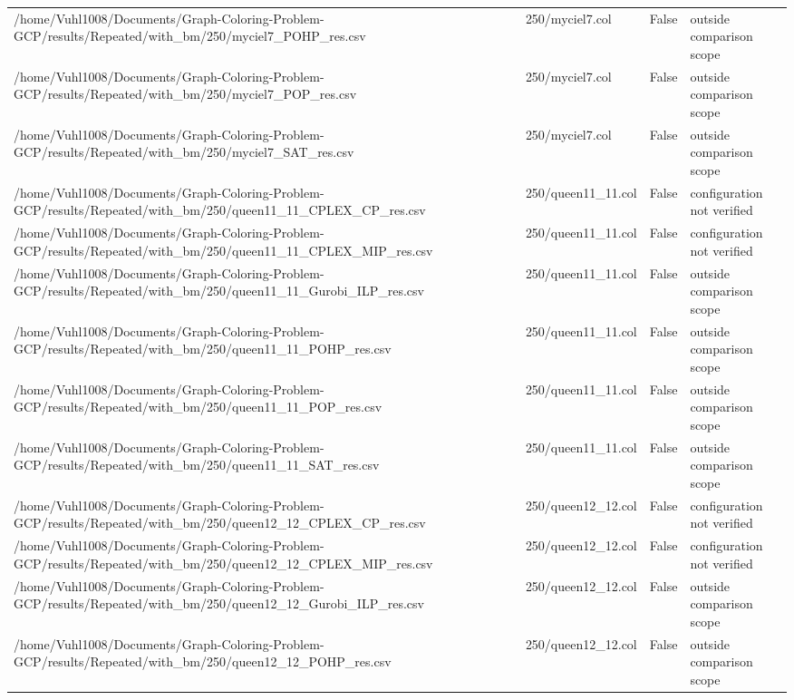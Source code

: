 \begin{table}[htbp]
\begin{tabular}{llll}
/home/Vuhl1008/Documents/Graph-Coloring-Problem-GCP/results/Repeated/with\_bm/250/myciel7\_POHP\_res.csv & 250/myciel7.col & False & outside comparison scope \\
/home/Vuhl1008/Documents/Graph-Coloring-Problem-GCP/results/Repeated/with\_bm/250/myciel7\_POP\_res.csv & 250/myciel7.col & False & outside comparison scope \\
/home/Vuhl1008/Documents/Graph-Coloring-Problem-GCP/results/Repeated/with\_bm/250/myciel7\_SAT\_res.csv & 250/myciel7.col & False & outside comparison scope \\
/home/Vuhl1008/Documents/Graph-Coloring-Problem-GCP/results/Repeated/with\_bm/250/queen11\_11\_CPLEX\_CP\_res.csv & 250/queen11\_11.col & False & configuration not verified \\
/home/Vuhl1008/Documents/Graph-Coloring-Problem-GCP/results/Repeated/with\_bm/250/queen11\_11\_CPLEX\_MIP\_res.csv & 250/queen11\_11.col & False & configuration not verified \\
/home/Vuhl1008/Documents/Graph-Coloring-Problem-GCP/results/Repeated/with\_bm/250/queen11\_11\_Gurobi\_ILP\_res.csv & 250/queen11\_11.col & False & outside comparison scope \\
/home/Vuhl1008/Documents/Graph-Coloring-Problem-GCP/results/Repeated/with\_bm/250/queen11\_11\_POHP\_res.csv & 250/queen11\_11.col & False & outside comparison scope \\
/home/Vuhl1008/Documents/Graph-Coloring-Problem-GCP/results/Repeated/with\_bm/250/queen11\_11\_POP\_res.csv & 250/queen11\_11.col & False & outside comparison scope \\
/home/Vuhl1008/Documents/Graph-Coloring-Problem-GCP/results/Repeated/with\_bm/250/queen11\_11\_SAT\_res.csv & 250/queen11\_11.col & False & outside comparison scope \\
/home/Vuhl1008/Documents/Graph-Coloring-Problem-GCP/results/Repeated/with\_bm/250/queen12\_12\_CPLEX\_CP\_res.csv & 250/queen12\_12.col & False & configuration not verified \\
/home/Vuhl1008/Documents/Graph-Coloring-Problem-GCP/results/Repeated/with\_bm/250/queen12\_12\_CPLEX\_MIP\_res.csv & 250/queen12\_12.col & False & configuration not verified \\
/home/Vuhl1008/Documents/Graph-Coloring-Problem-GCP/results/Repeated/with\_bm/250/queen12\_12\_Gurobi\_ILP\_res.csv & 250/queen12\_12.col & False & outside comparison scope \\
/home/Vuhl1008/Documents/Graph-Coloring-Problem-GCP/results/Repeated/with\_bm/250/queen12\_12\_POHP\_res.csv & 250/queen12\_12.col & False & outside comparison scope \\

\end{tabular}
\end{table}
